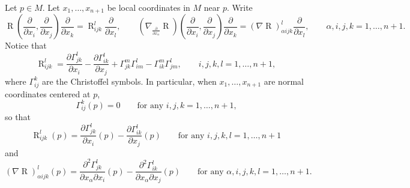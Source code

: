 \documentclass[11pt]{amsart}
\newcommand{\A}{\mathbf{A}}
\newcommand{\B}{\mathbf{B}}
\newcommand{\E}{\mathbf{E}}
\DeclareMathOperator{\ric}{Ric}
\DeclareMathOperator{\divv}{div}
\DeclareMathOperator{\R}{R}
\theoremstyle{definition}
\theoremstyle{remark}
\numberwithin{equation}{section}
\begin{document}
 Let $p\in M$. Let $x_1,\ldots,x_{n+1}$ be local coordinates in $M$ near $p$.
 Write 
 \begin{equation*}
     \R\left(\frac{\partial }{\partial x_i},\frac{\partial}{\partial x_j}\right)\frac{\partial }{\partial x_k}=\R_{ijk}^l\frac{\partial}{\partial x_l},\qquad  \left(\nabla_{\frac{\partial}{\partial x_\alpha}}\R\right)\left(\frac{\partial }{\partial x_i},\frac{\partial}{\partial x_j}\right)\frac{\partial }{\partial x_k}=\left(\nabla \R\right)_{\alpha i j k}^l\frac{\partial}{\partial x_l},\qquad\alpha,i,j,k=1,\ldots,n+1.
 \end{equation*}
 Notice that 
 \begin{equation}\label{riemanincoordinate}
     \R_{ijk}^l=\frac{\partial\Gamma_{jk}^l}{\partial x_i}-\frac{\partial \Gamma_{ik}^l}{\partial x_j}+\Gamma_{jk}^m\Gamma_{im}^l-\Gamma_{ik}^m\Gamma_{jm}^l,\qquad i,j,k,l=1,\ldots,n+1,
 \end{equation}
where $\Gamma^k_{ij}$ are the Christoffel symbols. In particular, when $x_1,\ldots,x_{n+1}$ are normal coordinates centered at $p$,
\begin{equation}\label{normcoordcristo}
   \Gamma_{ij}^{k}(p)=0\qquad\text{for any $i,j,k=1,\ldots,n+1$,} 
\end{equation}
 so that 
\begin{equation}\label{rieminnorm}
    \R_{ijk}^l(p)=\frac{\partial \Gamma_{jk}^l}{\partial x_i}(p)-\frac{\partial \Gamma_{ik}^l}{\partial x_j}(p)\qquad\text{for any $i,j,k,l=1,\ldots,n+1$}
\end{equation}
and 
\begin{equation}\label{deririeminnorm}
    \left(\nabla \R\right)_{\alpha ijk}^l(p)=\frac{\partial ^2\Gamma_{jk}^l}{\partial x_\alpha\partial x_i}(p)-\frac{\partial^2 \Gamma_{ik}^l}{\partial x_\alpha\partial x_j}(p)\qquad\text{for any $\alpha,i,j,k,l=1,\ldots,n+1$}.
\end{equation}
\end{document}
